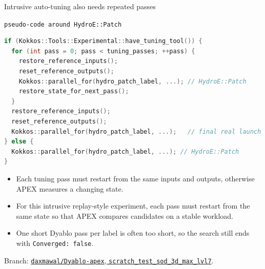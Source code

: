 \documentclass[11pt]{beamer}
\begin{document}
\begin{frame}[fragile,t]{Intrusive auto-tuning also needs repeated passes}
\begin{beamerboxesrounded}[upper=terminal title,lower=terminal body,width=\linewidth,shadow=false]{%
\textcolor{red!70}{\footnotesize\textbullet}\hspace{0.15em}%
\textcolor{yellow!80}{\footnotesize\textbullet}\hspace{0.15em}%
\textcolor{green!70!black}{\footnotesize\textbullet}\hspace{0.55em}%
\texttt{\scriptsize pseudo-code around HydroE::Patch}}
\begin{lstlisting}[language=C++,basicstyle=\ttfamily\tiny\color{termText},keywordstyle=\color{termText},stringstyle=\color{termText},commentstyle=\color{termText},identifierstyle=\color{termText},backgroundcolor=\color{termBg},numbers=none,frame=none,showstringspaces=false,columns=fullflexible]
if (Kokkos::Tools::Experimental::have_tuning_tool()) {
  for (int pass = 0; pass < tuning_passes; ++pass) {
    restore_reference_inputs();
    reset_reference_outputs();
    Kokkos::parallel_for(hydro_patch_label, ...); // HydroE::Patch
    restore_state_for_next_pass();
  }
  restore_reference_inputs();
  reset_reference_outputs();
  Kokkos::parallel_for(hydro_patch_label, ...);   // final real launch
} else {
  Kokkos::parallel_for(hydro_patch_label, ...); // HydroE::Patch
}
\end{lstlisting}
\end{beamerboxesrounded}

\vspace{0.1em}
\scriptsize
\begin{itemize}\itemsep0.08em
    \item Each tuning pass must restart from the same inputs and outputs, otherwise APEX measures a changing state.
    \item For this intrusive replay-style experiment, each pass must restart from the same state so that APEX compares candidates on a stable workload.
    \item One short Dyablo pass per label is often too short, so the search still ends with \texttt{Converged: false}.
\end{itemize}

{\tiny Branch: \href{https://github.com/daxmawal/Dyablo-apex/tree/scratch_test_sod_3d_max_lvl7}{\texttt{daxmawal/Dyablo-apex}, \texttt{scratch\_test\_sod\_3d\_max\_lvl7}}.}
\end{frame}
\end{document}
